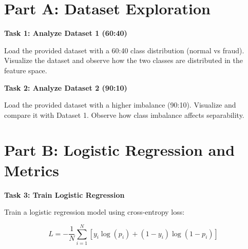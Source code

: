 \documentclass[12pt,a4paper]{article}
\begin{document}

\section*{Part A: Dataset Exploration}

\begin{tcolorbox}
\textbf{Task 1: Analyze Dataset 1 (60:40)}

Load the provided dataset with a 60:40 class distribution 
(normal vs fraud). Visualize the dataset and observe how the 
two classes are distributed in the feature space.

\vspace{2cm}
\vspace{2cm}
\end{tcolorbox}

\vspace{6pt}

\begin{tcolorbox}
\textbf{Task 2: Analyze Dataset 2 (90:10)}

Load the provided dataset with a higher imbalance (90:10). 
Visualize and compare it with Dataset 1. Observe how class 
imbalance affects separability.

\vspace{2cm}
\vspace{2cm}
\end{tcolorbox}


\section*{Part B: Logistic Regression and Metrics}

\begin{tcolorbox}
\textbf{Task 3: Train Logistic Regression}

Train a logistic regression model using cross-entropy loss:

\[
L = - \frac{1}{N} \sum_{i=1}^{N} \left[ y_i \log(p_i) + (1-y_i)\log(1-p_i) \right]
\]

\vspace{2cm}

\vspace{2cm}
\end{tcolorbox}

\vspace{6pt}
\end{document}
